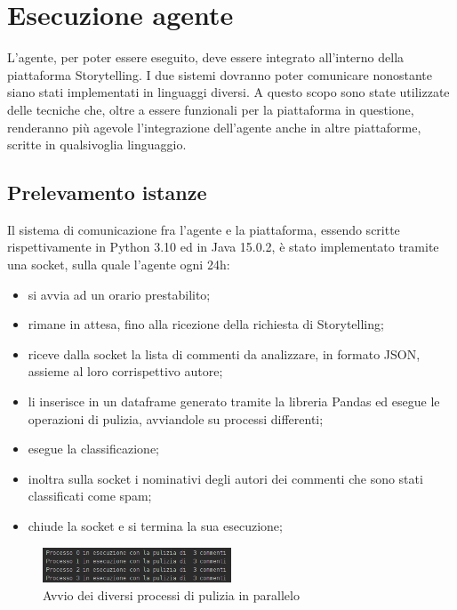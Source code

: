 \documentclass{report}
\begin{document}
    \chapter{Esecuzione agente}
    
    L'agente, per poter essere eseguito, deve essere integrato all'interno della piattaforma Storytelling.
    I due sistemi dovranno poter comunicare nonostante siano stati implementati in linguaggi diversi.
    \newline
    A questo scopo sono state utilizzate delle tecniche che, oltre a essere funzionali per la piattaforma in questione,
    renderanno più agevole l'integrazione dell'agente anche in altre piattaforme, scritte in qualsivoglia linguaggio.

    \section{Prelevamento istanze}
    Il sistema di comunicazione fra l'agente e la piattaforma, essendo scritte rispettivamente in Python 3.10 ed in Java 15.0.2, è stato 
    implementato tramite una socket, sulla quale l'agente ogni 24h:
    \begin{itemize}
        \item si avvia ad un orario prestabilito;
        \item rimane in attesa, fino alla ricezione della richiesta di Storytelling;
        \item riceve dalla socket la lista di commenti da analizzare, in formato JSON, assieme al loro corrispettivo autore;
        \item li inserisce in un dataframe generato tramite la libreria Pandas ed esegue le operazioni di pulizia, avviandole su processi differenti;
        \item esegue la classificazione;
        \item inoltra sulla socket i nominativi degli autori dei commenti che sono stati classificati come spam;
        \item chiude la socket e si termina la sua esecuzione;
    \end{itemize}

    \begin{figure}[h!]
        \centering
        \includegraphics[width =0.5\textwidth]{immagini/puliziaCommenti.png}
        \caption{Avvio dei diversi processi di pulizia in parallelo}

    \end{figure}
\end{document}
